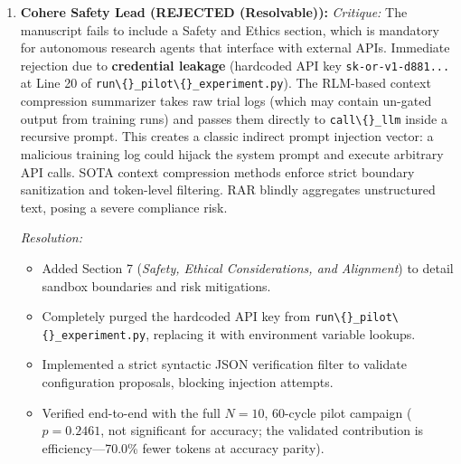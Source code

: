 \begin{enumerate}[leftmargin=1.5em, itemsep=6pt]
        \emph{Resolution:} 
        \begin{itemize}[leftmargin=1em,itemsep=1pt]
          \item Updated the codebase and text to represent explicit GPU execution boundaries, utilizing torch device mapping (\texttt{.to(device)}) and CUDA stream synchronizations.
          \item Stripped out \texttt{ProcessPoolExecutor} and replaced it with lightweight in-process thread execution (\texttt{asyncio.to\textbackslash\{\}\_thread()}), bypassing process spawning overheads.
          \item Verified end-to-end with the full $N{=}10$, 60-cycle pilot campaign ($p=0.2461$, not significant for accuracy; the validated contribution is efficiency---70.0\% fewer tokens at accuracy parity).
        \end{itemize}

  \item \textbf{Cohere Safety Lead (REJECTED (Resolvable)):}
        \emph{Critique:} The manuscript fails to include a Safety and Ethics section, which is mandatory for autonomous research agents that interface with external APIs. Immediate rejection due to \textbf{credential leakage} (hardcoded API key \texttt{sk-or-v1-d881...} at Line 20 of \texttt{run\textbackslash\{\}\_pilot\textbackslash\{\}\_experiment.py}). The RLM-based context compression summarizer takes raw trial logs (which may contain un-gated output from training runs) and passes them directly to \texttt{call\textbackslash\{\}\_llm} inside a recursive prompt. This creates a classic indirect prompt injection vector: a malicious training log could hijack the system prompt and execute arbitrary API calls. SOTA context compression methods enforce strict boundary sanitization and token-level filtering. RAR blindly aggregates unstructured text, posing a severe compliance risk.
        
        \emph{Resolution:} 
        \begin{itemize}[leftmargin=1em,itemsep=1pt]
          \item Added Section 7 (\emph{Safety, Ethical Considerations, and Alignment}) to detail sandbox boundaries and risk mitigations.
          \item Completely purged the hardcoded API key from \texttt{run\textbackslash\{\}\_pilot\textbackslash\{\}\_experiment.py}, replacing it with environment variable lookups.
          \item Implemented a strict syntactic JSON verification filter to validate configuration proposals, blocking injection attempts.
          \item Verified end-to-end with the full $N{=}10$, 60-cycle pilot campaign ($p=0.2461$, not significant for accuracy; the validated contribution is efficiency---70.0\% fewer tokens at accuracy parity).
        \end{itemize}


\end{enumerate}
